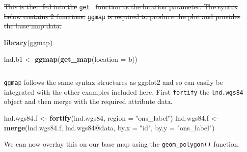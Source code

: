 \documentclass[]{article}
\newenvironment{Shaded}{}{}
\newcommand{\KeywordTok}[1]{\textcolor[rgb]{0.00,0.44,0.13}{\textbf{{#1}}}}
\newcommand{\DataTypeTok}[1]{\textcolor[rgb]{0.56,0.13,0.00}{{#1}}}
\newcommand{\DecValTok}[1]{\textcolor[rgb]{0.25,0.63,0.44}{{#1}}}
\newcommand{\FloatTok}[1]{\textcolor[rgb]{0.25,0.63,0.44}{{#1}}}
\newcommand{\StringTok}[1]{\textcolor[rgb]{0.25,0.44,0.63}{{#1}}}
\newcommand{\CommentTok}[1]{\textcolor[rgb]{0.38,0.63,0.69}{\textit{{#1}}}}
\newcommand{\NormalTok}[1]{{#1}}
\providecommand{\DIFdel}[1]{{\protect\color{red}\sout{#1}}}                      %
\providecommand{\DIFaddbegin}{} %
\providecommand{\DIFaddend}{} %
\providecommand{\DIFdelbegin}{} %
\providecommand{\DIFdelend}{} %
\begin{document}
\begin{Shaded}
\end{Shaded}
\DIFdelbegin \DIFdel{This is then fed into the }\texttt{\DIFdel{get}%
} %
\DIFdel{function as the location
parameter. The syntax below contains 2 functions. }\texttt{\DIFdel{ggmap}} %
\DIFdel{is
required to produce the plot and provides the base map data.
}\DIFdelend 

\begin{Shaded}
\begin{Highlighting}[]
\KeywordTok{library}\NormalTok{(ggmap)}

\NormalTok{lnd.b1 <- }\KeywordTok{ggmap}\NormalTok{(}\KeywordTok{get_map}\NormalTok{(}\DataTypeTok{location =} \NormalTok{b))}
\end{Highlighting}
\end{Shaded}
\DIFdelbegin %
\DIFdelend \DIFaddbegin \begin{verbatim}
\end{verbatim}

\DIFaddend \texttt{ggmap} follows the same syntax structures as ggplot2 and so can
easily be integrated with the other examples included here. First
\texttt{fortify} the \texttt{lnd.wgs84} object and then merge with the
required attribute data.

\begin{Shaded}
\begin{Highlighting}[]
\NormalTok{lnd.wgs84.f <- }\KeywordTok{fortify}\NormalTok{(lnd.wgs84, }\DataTypeTok{region =} \StringTok{"ons_label"}\NormalTok{)}
\NormalTok{lnd.wgs84.f <- }\KeywordTok{merge}\NormalTok{(lnd.wgs84.f, lnd.wgs84@data, }\DataTypeTok{by.x =} \StringTok{"id"}\NormalTok{, }\DataTypeTok{by.y =} \StringTok{"ons_label"}\NormalTok{)}
\end{Highlighting}
\end{Shaded}
We can now overlay this on our base map using the
\texttt{geom\_polygon()} function.
\end{document}
